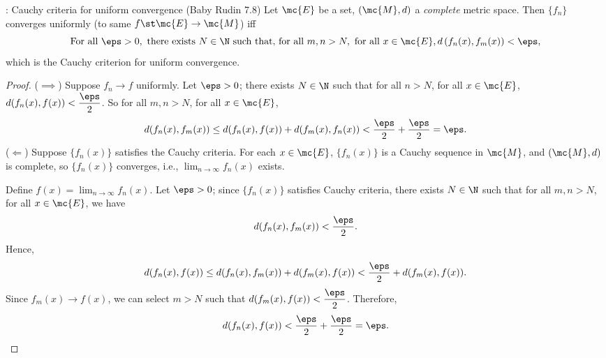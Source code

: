 \begin{ntheorem}{: Cauchy criteria for uniform convergence (Baby Rudin 7.8)}
	Let \(\mc{E}\) be a set, \((\mc{M},d)\) a \emph{complete} metric space. Then \(\{f_n\}\) converges uniformly (to same \(f\st \mc{E}\to\mc{M}\)) iff 
	\begin{equation*}
		\text{For all}~\eps>0,~\text{there exists}~N\in\N~\text{such that, for all}~m,n>N,~\text{for all}~x\in\mc{E},d\left(f_n(x),f_m(x)\right)<\eps,
	\end{equation*}
	which is the Cauchy criterion for uniform convergence.
\end{ntheorem}
\begin{proof}
	(\(\implies\)) Suppose \(f_n\to f\) uniformly. Let \(\eps>0\); there exists \(N\in\N\) such that for all \(n>N\), for all \(x\in\mc{E}\), \(d(f_n(x),f(x))<\displaystyle\frac{\eps}{2}\). So for all \(m,n>N\), for all \(x\in\mc{E}\), 
	\begin{equation*}
		d(f_n(x),f_m(x))\leq d(f_n(x),f(x))+d(f_m(x),f_n(x))<\frac{\eps}{2}+\frac{\eps}{2}=\eps.
	\end{equation*}
	(\(\Leftarrow\)) Suppose \(\{f_n(x)\}\) satisfies the Cauchy criteria. For each \(x\in\mc{E}\), \(\{f_n(x)\}\) is a Cauchy sequence in \(\mc{M}\), and \((\mc{M},d)\) is complete, so \(\{f_n(x)\}\) converges, i.e., \(\displaystyle\lim_{n\to\infty}f_n(x)\) exists.
	
	\medskip
	
	Define \(f(x)=\displaystyle\lim_{n\to\infty} f_n(x)\). Let \(\eps>0\); since \(\{f_n(x)\}\) satisfies Cauchy criteria, there exists \(N\in\N\) such that for all \(m,n>N\), for all \(x\in\mc{E}\), we have
	\begin{equation*}
		d(f_n(x),f_m(x))<\displaystyle\frac{\eps}{2}.
	\end{equation*}
	Hence, 
	\begin{equation*}
		d(f_n(x),f(x))\leq d(f_n(x),f_m(x))+d(f_m(x),f(x))<\frac{\eps}{2}+d(f_m(x),f(x)).
	\end{equation*}
	Since \(f_m(x)\to f(x)\), we can select \(m>N\) such that \(d(f_m(x),f(x))<\displaystyle\frac{\eps}{2}\). Therefore, 
	\begin{equation*}
		d(f_n(x),f(x))<\frac{\eps}{2}+\frac{\eps}{2}=\eps.
	\end{equation*}
\end{proof}